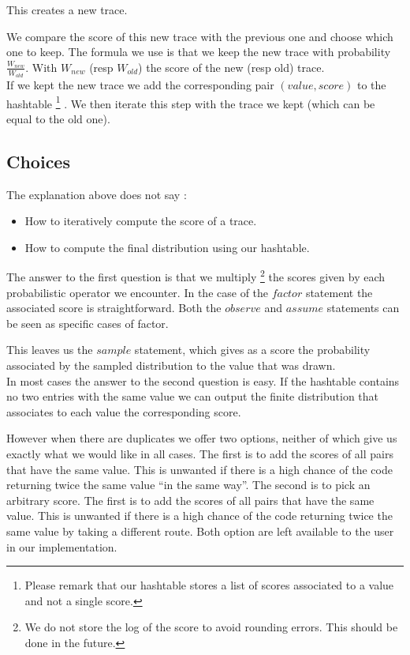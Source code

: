 \documentclass{article}
\begin{document}
This creates a new trace.

We compare the score of this new trace with the previous one and choose which
one to keep.
The formula we use is that we keep the new trace with probability $\frac{W_{new}}{W_{old}}$.
With $W_{new}$ (resp $W_{old}$) the score of the new (resp old) trace. \\

If we kept the new trace we add the corresponding pair $(value, score)$ to the hashtable
\footnote{Please remark that our hashtable stores a list of scores associated to a value and not a single score.}
.
We then iterate this step with the trace we kept (which can be equal to the old one).

\subsection{Choices}
\label{subseq:choice}

The explanation above does not say :
\begin{itemize}
	\item How to iteratively compute the score of a trace.
	\item How to compute the final distribution using our hashtable.
\end{itemize}

The answer to the first question is that we multiply
\footnote{We do not store the log of the score to avoid rounding errors. This should be done in the future.}
the scores given by each probabilistic operator we encounter.
In the case of the $factor$ statement the associated score is straightforward.
Both the $observe$ and $assume$ statements can be seen as specific cases of factor.

This leaves us the $sample$ statement, which gives as a score the probability
associated by the sampled distribution to the value that was drawn. \\

In most cases the answer to the second question is easy.
If the hashtable contains no two entries with the same value we can output the
finite distribution that associates to each value the corresponding score.

However when there are duplicates we offer two options, neither of which give us exactly what we would like in all cases.
The first is to add the scores of all pairs that have the same value. This is
unwanted if there is a high chance of the code returning twice the same value
``in the same way''.
The second is to pick an arbitrary score.
The first is to add the scores of all pairs that have the same value. This is
unwanted if there is a high chance of the code returning twice the same value
by taking a different route.
Both option are left available to the user in our implementation. \\
\end{document}
